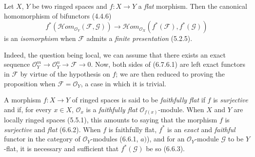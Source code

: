 \begin{env}[6.7.6]
\label{0.6.7.6}
Let $X$, $Y$ be two ringed spaces and $f:X\to Y$ a \emph{flat} morphism. Then
the canonical homomorphism of bifunctors (4.4.6)
\[
  f^*(\mathcal{H}om_{\mathcal O_Y}(\mathcal F,\mathcal G))
  \longrightarrow
  \mathcal{H}om_{\mathcal O_X}(f^*(\mathcal F),f^*(\mathcal G))
  \tag{6.7.6.1}
  \label{0.6.7.6.1}
\]
is an \emph{isomorphism} when $\mathcal F$ admits a \emph{finite presentation}
(5.2.5).

Indeed, the question being local, we can assume that there exists an exact
sequence $\mathcal O_Y^m\to\mathcal O_Y^n\to\mathcal F\to0$. Now, both
sides of (6.7.6.1) are left exact functors in $\mathcal F$ by
virtue of the hypothesis on $f$; we are then reduced to proving the proposition
when $\mathcal F=\mathcal O_Y$, a case in which it is trivial.
\end{env}

\begin{env}[6.7.8]
\label{0.6.7.8}
A morphism $f:X\to Y$ of ringed spaces is said to be \emph{faithfully flat} if
$f$ is \emph{surjective} and if, for every $x\in X$, $\mathcal O_x$ is a
\emph{faithfully flat} $\mathcal O_{f(x)}$-module. When $X$ and $Y$ are
locally ringed spaces (5.5.1), this amounts to saying that the
morphism $f$ is \emph{surjective} and \emph{flat} (6.6.2). When $f$ is faithfully flat,
$f^*$ is an \emph{exact} and \emph{faithful} functor in the category of
$\mathcal O_Y$-modules (6.6.1, $a)$), and for an $\mathcal O_Y$-module
$\mathcal G$ to be $Y$-flat, it is necessary and sufficient that $f^*(\mathcal G)$ be
so (6.6.3).
\end{env}

